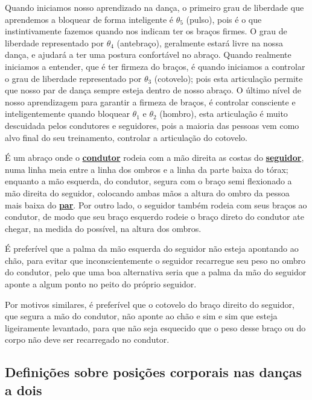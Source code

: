 Quando iniciamos nosso aprendizado na dança, 
o primeiro grau de liberdade que aprendemos a bloquear de forma inteligente é $\theta_5$ (pulso),
pois é o que instintivamente fazemos quando nos indicam ter os braços firmes.
O grau de liberdade representado por $\theta_4$ (antebraço), geralmente estará livre na nossa dança,
e ajudará a ter uma postura confortável no abraço.
Quando realmente iniciamos a entender, que é ter firmeza do braços,
é quando iniciamos a controlar o grau de liberdade representado por $\theta_3$ (cotovelo);
pois esta articulação permite que nosso par de dança sempre esteja dentro de nosso abraço.
O último nível de nosso aprendizagem para garantir a firmeza de braços,
é controlar consciente e inteligentemente quando bloquear  $\theta_1$ e $\theta_2$ (hombro),
esta articulação é muito descuidada pelos condutores e seguidores,
pois a maioria das pessoas vem como alvo final do seu treinamento,
controlar a articulação do cotovelo. 

\begin{definition}
\label{def:abracodedanca}  
É um abraço onde o \hyperref[def:Condutor]{\textbf{condutor}} 
rodeia com a mão direita as costas do \hyperref[def:Seguidor]{\textbf{seguidor}},
numa linha meia entre a linha dos ombros e a linha da parte baixa do tórax;
enquanto a mão esquerda, do condutor, segura com o braço semi flexionado a mão direita do seguidor,
colocando ambas mãos a altura do ombro da pessoa mais baixa do \hyperref[def:Par]{\textbf{par}}.
Por outro lado, o seguidor também rodeia com seus braços ao condutor,
de modo que seu braço esquerdo rodeie o braço direto do condutor ate chegar,
na medida do possível, na altura dos ombros. 

É preferível que a palma da mão esquerda do seguidor não esteja apontando ao chão,
para evitar que inconscientemente o seguidor recarregue seu peso no ombro do condutor,
pelo que uma boa alternativa seria que a palma da mão do seguidor aponte a algum ponto no peito do próprio seguidor.

Por motivos similares, é preferível que o cotovelo do braço direito do seguidor,
que segura a mão do condutor,
não aponte ao chão e sim e sim que esteja ligeiramente levantado,
para que não seja esquecido que o peso desse braço ou do corpo não deve ser recarregado no condutor. 
\end{definition}

\subsection{Definições sobre posições corporais  nas danças a dois}


